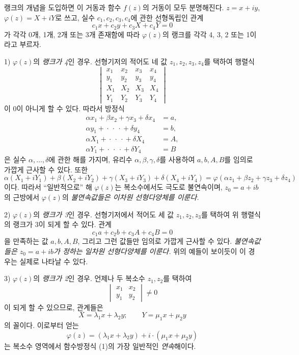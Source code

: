 랭크의 개념을 도입하면 이 거동과 함수 \(f(z)\)의 거동이 모두 분명해진다. \(z=x+iy\), \(\varphi(z)=X+iY\)로 쓰고, 실수 \(c_1,c_2,c_3,c_4\)에 관한 선형독립인 관계
\[
c_1x+c_2y+c_3X+c_4Y=0
\]
가 각각 0개, 1개, 2개 또는 3개 존재함에 따라 \(\varphi(z)\)의 랭크를 각각 4, 3, 2 또는 1이라고 부르자.

1) \(\varphi(z)\)의 \emph{랭크가 4}인 경우. 선형기저의 적어도 네 값 \(z_1,z_2,z_3,z_4\)를 택하여 행렬식
\[
\begin{vmatrix}
x_1&x_2&x_3&x_4\\
y_1&y_2&y_3&y_4\\
X_1&X_2&X_3&X_4\\
Y_1&Y_2&Y_3&Y_4
\end{vmatrix}
\]
이 0이 아니게 할 수 있다. 따라서 방정식
\[
\begin{aligned}
\alpha x_1+\beta x_2+\gamma x_3+\delta x_4&=a,\\
\alpha y_1+{}\cdot{}\ \cdot{}\ \cdot{}+\delta y_4&=b,\\
\alpha X_1+{}\cdot{}\ \cdot{}\ \cdot{}+\delta X_4&=A,\\
\alpha Y_1+{}\cdot{}\ \cdot{}\ \cdot{}+\delta Y_4&=B
\end{aligned}
\]
은 실수 \(\alpha,\ldots,\delta\)에 관한 해를 가지며, 유리수 \(\alpha,\beta,\gamma,\delta\)를 사용하여 \(a,b,A,B\)를 임의로 가깝게 근사할 수 있다. 또한
\[
\alpha(X_1+iY_1)+\beta(X_2+iY_2)+\gamma(X_3+iY_3)+\delta(X_4+iY_4)
=\varphi(\alpha z_1+\beta z_2+\gamma z_3+\delta z_4)
\]
이다. 따라서 ``일반적으로'' 해 \(\varphi(z)\)는 복소수에서도 극도로 불연속이며, \(z_0=a+ib\)의 근방에서 \(\varphi(z)\)의 \emph{불연속값들은 이차원 선형다양체를 이룬다.}

2) \(\varphi(z)\)의 \emph{랭크가 3}인 경우. 선형기저에서 적어도 세 값 \(z_1,z_2,z_3\)를 택하여 위 행렬식의 랭크가 3이 되게 할 수 있다. 관계
\[
c_1a+c_2b+c_3A+c_4B=0
\]
을 만족하는 값 \(a,b,A,B\), 그리고 그런 값들만 임의로 가깝게 근사할 수 있다. \emph{불연속값들은 \(z_0=a+ib\)가 정하는 일차원 선형다양체를 이룬다.} 위의 예들이 보이듯이 이 경우는 실제로 나타날 수 있다.

3) \(\varphi(z)\)의 \emph{랭크가 2}인 경우. 언제나 두 복소수 \(z_1,z_2\)를 택하여
\[
\begin{vmatrix}x_1&x_2\\ y_1&y_2\end{vmatrix}\ne0
\]
이 되게 할 수 있으므로, 관계들은
\[
X=\lambda_1x+\lambda_2y;\qquad Y=\mu_1x+\mu_2y
\]
의 꼴이다. 이로부터 얻는
\[
\varphi(z)=(\lambda_1x+\lambda_2y)+i\cdot(\mu_1x+\mu_2y)
\]
는 복소수 영역에서 함수방정식 (1)의 가장 일반적인 \emph{연속}해이다.

